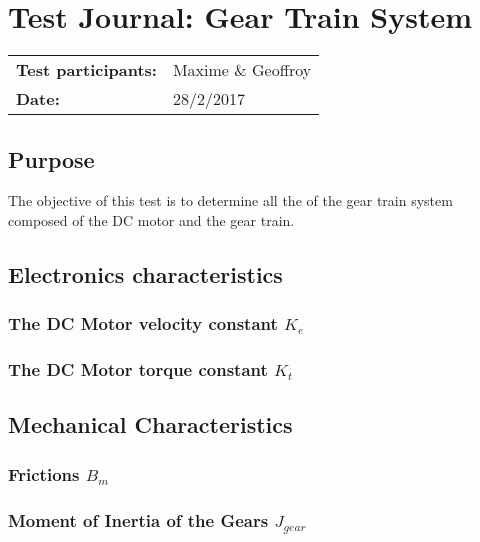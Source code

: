 \graphicspath{{figures/appendix/"Motor&GearTests"/}}
\chapter{Test Journal: Gear Train System}\label{appendix:DCMotorInductance}
\begin{table}[htbp]
\begin{tabular}{l l}
\textbf{Test participants:} & Maxime \& Geoffroy  \\
\textbf{Date:}  & 28/2/2017
\end{tabular}
\end{table}

\section*{Purpose}
The objective of this test is to determine all the of the gear train system composed of the DC motor and the gear train.
\section{Electronics characteristics}



\subsection{The DC Motor velocity constant $K_e$}\label{sec:MeasKe}



\subsection{The DC Motor torque constant $K_t$}\label{sec:MeasKt}


\section{Mechanical Characteristics}

\subsection{Frictions $B_m$}\label{sec:MeasBm}


\subsection{Moment of Inertia of the Gears $J_{gear}$}\label{sec:MeasJg}




